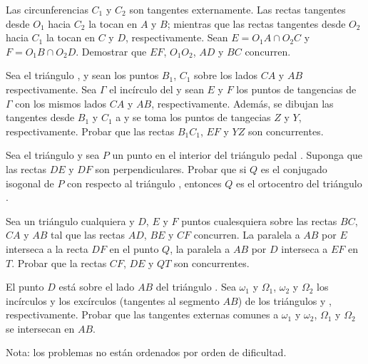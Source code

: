 \begin{section-problem}
    Las circunferencias $C_1$ y $C_2$ son tangentes externamente.
    Las rectas tangentes desde $O_1$ hacia $C_2$ la tocan en $A$ y $B$; mientras que las rectas tangentes desde $O_2$ hacia $C_1$ la tocan en $C$ y $D$, respectivamente.
    Sean $E = O_1 A \cap O_2 C$ y $F = O_1 B \cap O_2 D$.
    Demostrar que $EF$, $O_1 O_2$, $AD$ y $BC$ concurren.
\end{section-problem}

\begin{section-problem}
    Sea el triángulo , y sean los puntos $B_1$, $C_1$ sobre los lados $CA$ y $AB$ respectivamente.
    Sea $\Gamma$ el incírculo del  y sean $E$ y $F$ los puntos de tangencias de $\Gamma$ con los mismos lados $CA$ y $AB$, respectivamente.
    Además, se dibujan las tangentes desde $B_1$ y $C_1$ a  y se toma los puntos de tangecias $Z$ y $Y$, respectivamente.
    Probar que las rectas $B_1 C_1$, $EF$ y $YZ$ son concurrentes.
\end{section-problem}

\begin{section-problem}
    Sea el triángulo  y sea $P$ un punto en el interior del triángulo pedal .
    Suponga que las rectas $DE$ y $DF$ son perpendiculares.
    Probar que si $Q$ es el conjugado isogonal de $P$ con respecto al triángulo , entonces $Q$ es el ortocentro del triángulo .
\end{section-problem}

\begin{section-problem}
    Sea  un triángulo cualquiera y $D$, $E$ y $F$ puntos cualesquiera sobre las rectas $BC$, $CA$ y $AB$ tal que las rectas $AD$, $BE$ y $CF$ concurren.
    La paralela a $AB$ por $E$ interseca a la recta $DF$ en el punto $Q$, la paralela a $AB$ por $D$ interseca a $EF$ en $T$.
    Probar que la rectas $CF$, $DE$ y $QT$ son concurrentes.
\end{section-problem}

\begin{section-problem}
    El punto $D$ está sobre el lado $AB$ del triángulo .
    Sea $\omega_1$ y $\Omega_1$, $\omega_2$ y $\Omega_2$ los incírculos y los excírculos (tangentes al segmento $AB$) de los triángulos  y , respectivamente.
    Probar que las tangentes externas comunes a $\omega_1$ y $\omega_2$, $\Omega_1$ y $\Omega_2$ se intersecan en $AB$.
\end{section-problem}

Nota: los problemas no están ordenados por orden de dificultad.